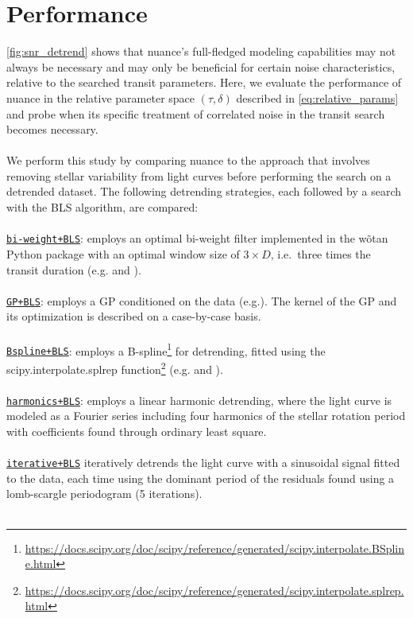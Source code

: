 \documentclass[modern]{aastex631}
\newcommand{\footlink}[1]{\footnote{\url{#1}}}
\begin{document}
\section{Performance}\label{results}
\autoref{fig:snr_detrend} shows that \textsf{nuance}'s full-fledged modeling capabilities may not always be necessary and may only be beneficial for certain noise characteristics, relative to the searched transit parameters. Here, we evaluate the performance of \textsf{nuance} in the relative parameter space $(\tau, \delta)$ described in \autoref{eq:relative_params} and probe when its specific treatment of correlated noise in the transit search becomes necessary.\\\\
We perform this study by comparing \textsf{nuance} to the approach that involves removing stellar variability from light curves before performing the search on a detrended dataset. The following detrending strategies, each followed by a search with the \textsf{BLS} algorithm, are compared:\\\\
\ul{\texttt{bi-weight+BLS}}: employs an optimal bi-weight filter implemented in the \textsf{wõtan} Python package with an optimal window size of $3\times D$, i.e.\, three times the transit duration (e.g.\;\citealt{wotan} and \citealt{Dransfield2024}).\\\\
\ul{\texttt{GP+BLS}}: employs a GP conditioned on the data (e.g.\;\citealt{Lienhard2020}). The kernel of the GP and its optimization is described on a case-by-case basis.\\\\
\ul{\texttt{Bspline+BLS}}: employs a B-spline\footlink{https://docs.scipy.org/doc/scipy/reference/generated/scipy.interpolate.BSpline.html} for detrending, fitted using the \textsf{scipy.interpolate.splrep} function\footlink{https://docs.scipy.org/doc/scipy/reference/generated/scipy.interpolate.splrep.html} (e.g.\;\citealt{wotan} and \citealt{Canocchi2023}).\\\\
\ul{\texttt{harmonics+BLS}}: employs a linear harmonic detrending, where the light curve is modeled as a Fourier series including four harmonics of the stellar rotation period with coefficients found through ordinary least square.\\\\
\ul{\texttt{iterative+BLS}} iteratively detrends the light curve with a sinusoidal signal fitted to the data, each time using the dominant period of the residuals found using a lomb-scargle periodogram (5 iterations).\\\\
\end{document}
